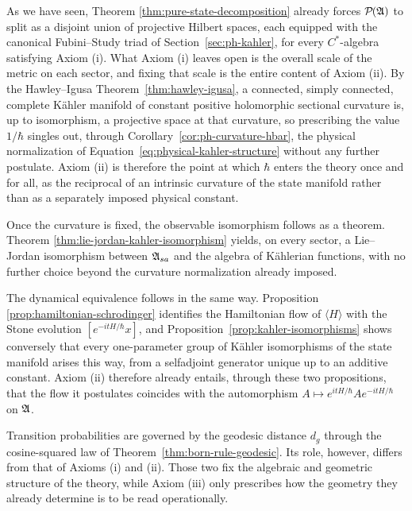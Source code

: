 \begin{remark}
	As we have seen, Theorem \ref{thm:pure-state-decomposition} already forces $\mathcal{P}(\A)$ to split as a disjoint union of projective Hilbert spaces, each equipped with the canonical Fubini--Study triad of Section~\ref{sec:ph-kahler}, for every $C^*$-algebra satisfying Axiom (i).
	What Axiom (i) leaves open is the overall scale of the metric on each sector, and fixing
	that scale is the entire content of Axiom (ii). By the Hawley--Igusa
	Theorem~\ref{thm:hawley-igusa}, a connected, simply connected, complete Kähler manifold of constant positive holomorphic sectional curvature is, up to isomorphism, a projective space at that curvature, so prescribing the value $1/\hbar$ singles out, through
	Corollary~\ref{cor:ph-curvature-hbar}, the physical normalization of
	Equation~\eqref{eq:physical-kahler-structure} without any further postulate. Axiom (ii) is
	therefore the point at which $\hbar$ enters the theory once and for all, as the reciprocal
	of an intrinsic curvature of the state manifold rather than as a separately imposed physical
	constant.
	
	Once the curvature is fixed, the observable isomorphism follows as a theorem. Theorem
	\ref{thm:lie-jordan-kahler-isomorphism} yields, on every sector, a Lie--Jordan isomorphism
	between $\mathfrak{A}_{sa}$ and the algebra of Kählerian functions, with no further choice
	beyond the curvature normalization already imposed.
	
	The dynamical equivalence follows in the same way. Proposition
	\ref{prop:hamiltonian-schrodinger} identifies the Hamiltonian flow of
	$\langle H \rangle$ with the Stone evolution $[e^{-itH/\hbar}x]$, and
	Proposition~\ref{prop:kahler-isomorphisms} shows conversely that every
	one-parameter group of Kähler isomorphisms of the state manifold arises this way, from a
	selfadjoint generator unique up to an additive constant. Axiom (ii) therefore already
	entails, through these two propositions, that the flow it postulates coincides with the
	automorphism $A \mapsto e^{itH/\hbar}Ae^{-itH/\hbar}$ on $\mathfrak{A}$.
\end{remark}

\begin{remark}
	Transition probabilities are governed by the geodesic distance $d_g$ through the cosine-squared law of Theorem~\ref{thm:born-rule-geodesic}. Its role, however, differs from that of Axioms (i) and (ii). Those two fix the algebraic and geometric structure of the theory, while Axiom (iii) only prescribes how the geometry they already determine is to be read operationally.
\end{remark}


